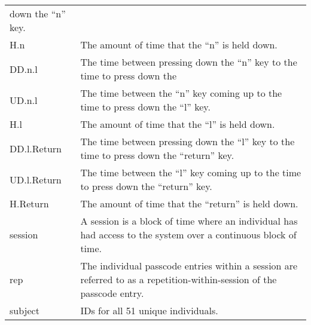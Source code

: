 \documentclass[]{article}
\begin{document}
\begin{longtable}[]{@{}ll@{}}
down the ``n'' key.\tabularnewline
H.n & The amount of time that the ``n'' is held down.\tabularnewline
DD.n.l & The time between pressing down the ``n'' key to the time to
press down the\tabularnewline
UD.n.l & The time between the ``n'' key coming up to the time to press
down the ``l'' key.\tabularnewline
H.l & The amount of time that the ``l'' is held down.\tabularnewline
DD.l.Return & The time between pressing down the ``l'' key to the time
to press down the ``return'' key.\tabularnewline
UD.l.Return & The time between the ``l'' key coming up to the time to
press down the ``return'' key.\tabularnewline
H.Return & The amount of time that the ``return'' is held
down.\tabularnewline
session & A session is a block of time where an individual has had
access to the system over a continuous block of time.\tabularnewline
rep & The individual passcode entries within a session are referred to
as a repetition-within-session of the passcode entry.\tabularnewline
subject & IDs for all 51 unique individuals.\tabularnewline
\bottomrule
\end{longtable}

\subsection{\texorpdfstring{\label{appendix:shortened.subject.map}}{}}\label{section-1}
\end{document}
